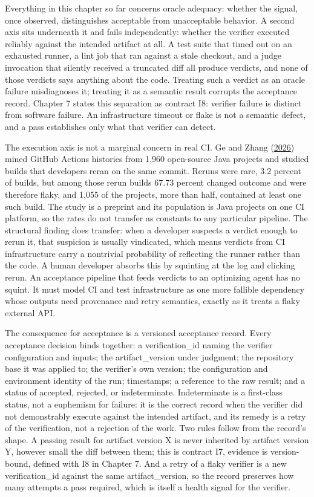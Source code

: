 Everything in this chapter so far concerns oracle adequacy: whether the signal, once observed, distinguishes acceptable from unacceptable behavior. A second axis sits underneath it and fails independently: whether the verifier executed reliably against the intended artifact at all. A test suite that timed out on an exhausted runner, a lint job that ran against a stale checkout, and a judge invocation that silently received a truncated diff all produce verdicts, and none of those verdicts says anything about the code. Treating such a verdict as an oracle failure misdiagnoses it; treating it as a semantic result corrupts the acceptance record. Chapter 7 states this separation as contract I8: verifier failure is distinct from software failure. An infrastructure timeout or flake is not a semantic defect, and a pass establishes only what that verifier can detect.

The execution axis is not a marginal concern in real CI. Ge and Zhang (\href{https://arxiv.org/abs/2602.02307}{2026}) mined GitHub Actions histories from 1,960 open-source Java projects and studied builds that developers reran on the same commit. Reruns were rare, 3.2 percent of builds, but among those rerun builds 67.73 percent changed outcome and were therefore flaky, and 1,055 of the projects, more than half, contained at least one such build. The study is a preprint and its population is Java projects on one CI platform, so the rates do not transfer as constants to any particular pipeline. The structural finding does transfer: when a developer suspects a verdict enough to rerun it, that suspicion is usually vindicated, which means verdicts from CI infrastructure carry a nontrivial probability of reflecting the runner rather than the code. A human developer absorbs this by squinting at the log and clicking rerun. An acceptance pipeline that feeds verdicts to an optimizing agent has no squint. It must model CI and test infrastructure as one more fallible dependency whose outputs need provenance and retry semantics, exactly as it treats a flaky external API.

The consequence for acceptance is a versioned acceptance record. Every acceptance decision binds together: a verification\_id naming the verifier configuration and inputs; the artifact\_version under judgment; the repository base it was applied to; the verifier's own version; the configuration and environment identity of the run; timestamps; a reference to the raw result; and a status of accepted, rejected, or indeterminate. Indeterminate is a first-class status, not a euphemism for failure: it is the correct record when the verifier did not demonstrably execute against the intended artifact, and its remedy is a retry of the verification, not a rejection of the work. Two rules follow from the record's shape. A passing result for artifact version X is never inherited by artifact version Y, however small the diff between them; this is contract I7, evidence is version-bound, defined with I8 in Chapter 7. And a retry of a flaky verifier is a new verification\_id against the same artifact\_version, so the record preserves how many attempts a pass required, which is itself a health signal for the verifier.

